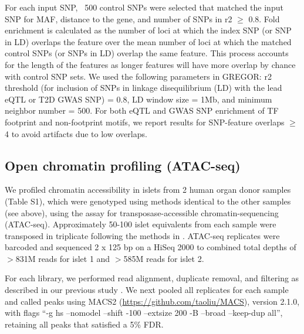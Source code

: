 For each input SNP, ~500 control SNPs were selected that matched the input SNP for MAF, distance to the gene, and number of SNPs in r2 $\geq$ 0.8. Fold enrichment is calculated as the number of loci at which the index SNP (or SNP in LD) overlaps the feature over the mean number of loci at which the matched control SNPs (or SNPs in LD) overlap the same feature. This process accounts for the length of the features as longer features will have more overlap by chance with control SNP sets. We used the following parameters in GREGOR: r2 threshold (for inclusion of SNPs in linkage disequilibrium (LD) with the lead eQTL or T2D GWAS SNP) = 0.8, LD window size = 1Mb, and minimum neighbor number = 500. For both eQTL and GWAS SNP enrichment of TF footprint and non-footprint motifs, we report results for SNP-feature overlaps $\geq$ 4 to avoid artifacts due to low overlaps.

\subsection{Open chromatin profiling (ATAC-seq)}
We profiled chromatin accessibility in islets from 2 human organ donor samples (Table S1), which were genotyped using methods identical to the other samples (see above), using the assay for transposase-accessible chromatin-sequencing (ATAC-seq).  Approximately 50-100 islet equivalents from each sample were transposed in triplicate following the methods in \cite{buenrostroTranspositionNativeChromatin2013}.  ATAC-seq replicates were barcoded and sequenced 2 x 125 bp on a HiSeq 2000 to combined total depths of $>$831M reads for islet 1 and $>$585M reads for islet 2.

For each library, we performed read alignment, duplicate removal, and filtering as described in our previous study \cite{scottGeneticRegulatorySignature2016}. We next pooled all replicates for each sample and called peaks using MACS2 (\url{https://github.com/taoliu/MACS}), version 2.1.0, with flags “-g hs --nomodel --shift -100 --extsize 200 -B --broad --keep-dup all”, retaining all peaks that satisfied a 5\% FDR.

